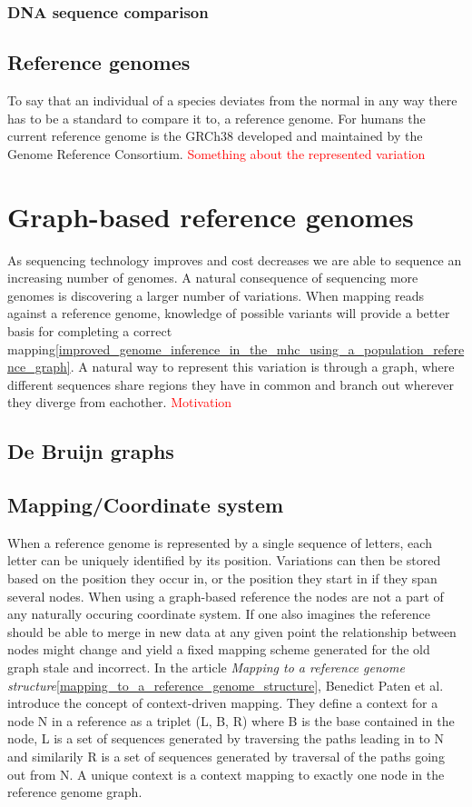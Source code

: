 \documentclass[thesis.tex]{subfiles}
\begin{document}
\subsubsection{DNA sequence comparison}

\subsection{Reference genomes}
To say that an individual of a species deviates from the normal in any way there has to be a standard to compare it to, a reference genome. For humans the current reference genome is the GRCh38 developed and maintained by the Genome Reference Consortium. \textcolor{red}{Something about the represented variation}
\section{Graph-based reference genomes}
As sequencing technology improves and cost decreases we are able to sequence an increasing number of genomes. A natural consequence of sequencing more genomes is discovering a larger number of variations. When mapping reads against a reference genome, knowledge of possible variants will provide a better basis for completing a correct mapping\ref{improved_genome_inference_in_the_mhc_using_a_population_reference_graph}. A natural way to represent this variation is through a graph, where different sequences share regions they have in common and branch out wherever they diverge from eachother. 
\textcolor{red}{Motivation}
\subsection{De Bruijn graphs}
\subsection{Mapping/Coordinate system}
When a reference genome is represented by a single sequence of letters, each letter can be uniquely identified by its position. Variations can then be stored based on the position they occur in, or the position they start in if they span several nodes. When using a graph-based reference the nodes are not a part of any naturally occuring coordinate system. If one also imagines the reference should be able to merge in new data at any given point the relationship between nodes might change and yield a fixed mapping scheme generated for the old graph stale and incorrect. In the article \textit{Mapping to a reference genome structure}\ref{mapping_to_a_reference_genome_structure}, Benedict Paten et al. introduce the concept of context-driven mapping. They define a context for a node N in a reference as a triplet (L, B, R) where B is the base contained in the node, L is a set of sequences generated by traversing the paths leading in to N and similarily R is a set of sequences generated by traversal of the paths going out from N. A unique context is a context mapping to exactly one node in the reference genome graph.
\end{document}
